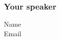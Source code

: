 \begin{frame}
  \frametitle{Your speaker}
  \begin{description}
  \item[Name] \UserName
  \item[Email] \UserEmail
  \end{description}
\end{frame}

